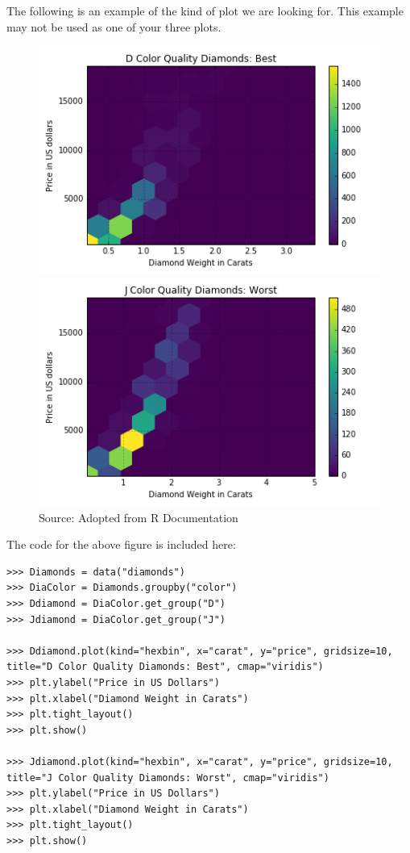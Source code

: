\documentclass[12pt]{article}
\begin{document}
The following is an example of the kind of plot we are looking for. 
This example may not be used as one of your three plots.
\begin{figure}[H] %
    \centering
    \begin{minipage}[b]{0.48\textwidth}
    \includegraphics[width=\textwidth]{DiamondD.png}
    \end{minipage}
    \quad
    \begin{minipage}[b]{0.48\textwidth}
    \includegraphics[width=\textwidth]{DiamondJ.png}
    \end{minipage}
    \caption{Source: Adopted from R Documentation}
    \label{fig:intro2}
\end{figure}

The code for the above figure is included here:
\begin{lstlisting}
>>> Diamonds = data("diamonds")
>>> DiaColor = Diamonds.groupby("color")
>>> Ddiamond = DiaColor.get_group("D")
>>> Jdiamond = DiaColor.get_group("J")

>>> Ddiamond.plot(kind="hexbin", x="carat", y="price", gridsize=10, title="D Color Quality Diamonds: Best", cmap="viridis")
>>> plt.ylabel("Price in US Dollars")
>>> plt.xlabel("Diamond Weight in Carats")
>>> plt.tight_layout()
>>> plt.show()

>>> Jdiamond.plot(kind="hexbin", x="carat", y="price", gridsize=10, title="J Color Quality Diamonds: Worst", cmap="viridis")
>>> plt.ylabel("Price in US Dollars")
>>> plt.xlabel("Diamond Weight in Carats")
>>> plt.tight_layout()
>>> plt.show()
\end{lstlisting}
\end{document}
